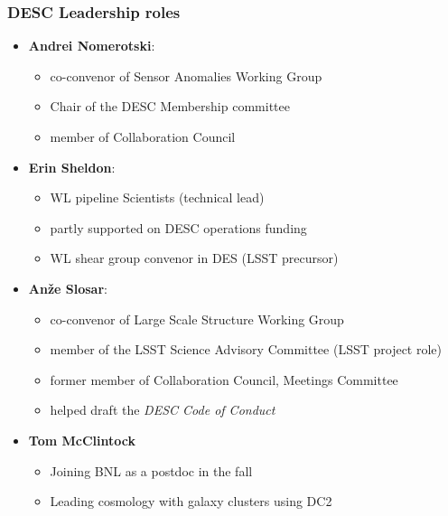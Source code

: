 \documentclass[aspectratio=169]{beamer}
\begin{document}
\begin{frame}
  \frametitle{DESC Leadership roles}

  \begin{itemize}
      \item \textbf{Andrei Nomerotski}:
          \begin{itemize}
              \item co-convenor of Sensor Anomalies Working Group
              \item Chair of the DESC Membership committee
              \item member of Collaboration Council
          \end{itemize}

      \item \textbf{Erin Sheldon}:
          \begin{itemize}
              \item WL pipeline Scientists (technical lead)
              \item partly supported on DESC  operations funding
              \item WL shear group convenor in DES (LSST precursor)
          \end{itemize}

      \item \textbf{An\v{z}e Slosar}: 
          \begin{itemize}
              \item co-convenor of Large Scale Structure Working Group
              \item member of the LSST Science Advisory Committee (LSST project role)
              \item former member of Collaboration Council, Meetings Committee
              \item helped draft the \emph {DESC Code of Conduct}

        \end{itemize}

    \item \textbf{Tom McClintock}
        \begin{itemize}
            \item Joining BNL as a postdoc in the fall
            \item Leading cosmology with galaxy
                clusters using DC2
        \end{itemize}


\end{itemize}

\end{frame}
\end{document}
